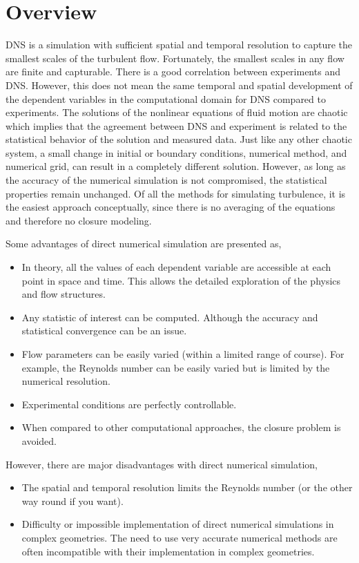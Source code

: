\documentclass[12pt,oneside,a4paper,english]{article}
\begin{document}
\section{Overview}
DNS is a simulation with sufficient spatial and temporal resolution to capture the smallest scales of the turbulent flow. Fortunately, the smallest scales in any flow are finite and capturable. There is a good correlation between experiments and DNS. However, this does not mean the same temporal and spatial development of the dependent variables in the computational domain for DNS compared to experiments. The solutions of the nonlinear equations of fluid motion are chaotic which implies that the agreement between DNS and experiment is related to the statistical behavior of the solution and measured data. Just like any other chaotic system, a small change in initial or boundary conditions, numerical method, and numerical grid, can result in a completely different solution. However, as long as the accuracy of the numerical simulation is not compromised, the statistical properties remain unchanged. Of all the methods for simulating turbulence, it is the easiest approach conceptually, since there is no averaging of the equations and therefore no closure modeling.

\noindent
Some advantages of direct numerical simulation are presented as,
\begin{itemize}
\item In theory, all the values of each dependent variable are accessible at each point in space and time. This allows the detailed exploration of the physics and flow structures.
\item Any statistic of interest can be computed. Although the accuracy and statistical convergence can be an issue.
\item Flow parameters can be easily varied (within a limited range of course). For example, the Reynolds number can be easily varied but is limited by the numerical resolution.
\item Experimental conditions are perfectly controllable.
\item When compared to other computational approaches, the closure problem is avoided.
\end{itemize}


\noindent
However, there are major disadvantages with direct numerical simulation,
\begin{itemize}
\item The spatial and temporal resolution limits the Reynolds number (or the other way round if you want).
\item Difficulty or impossible implementation of direct numerical simulations in complex geometries. The need to use very accurate numerical methods are often incompatible with their implementation in complex geometries.
\end{itemize}
\end{document}
